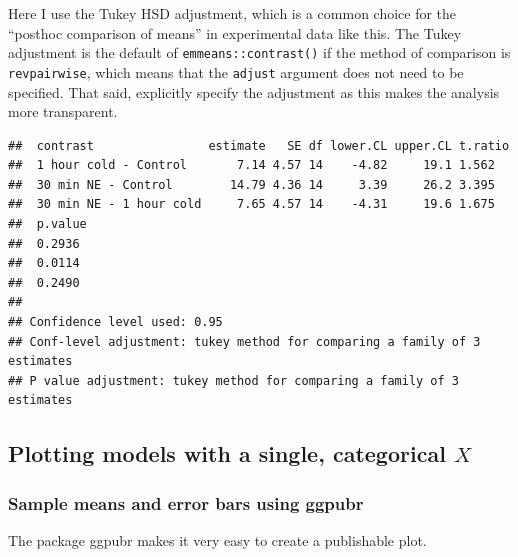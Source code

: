 \documentclass[]{book}
\newenvironment{Shaded}{\begin{snugshade}}{\end{snugshade}}
\newcommand{\DataTypeTok}[1]{\textcolor[rgb]{0.13,0.29,0.53}{#1}}
\newcommand{\KeywordTok}[1]{\textcolor[rgb]{0.13,0.29,0.53}{\textbf{#1}}}
\newcommand{\NormalTok}[1]{#1}
\newcommand{\OperatorTok}[1]{\textcolor[rgb]{0.81,0.36,0.00}{\textbf{#1}}}
\newcommand{\OtherTok}[1]{\textcolor[rgb]{0.56,0.35,0.01}{#1}}
\newcommand{\StringTok}[1]{\textcolor[rgb]{0.31,0.60,0.02}{#1}}
\begin{document}
Here I use the Tukey HSD adjustment, which is a common choice for the ``posthoc comparison of means'' in experimental data like this. The Tukey adjustment is the default of \texttt{emmeans::contrast()} if the method of comparison is \texttt{revpairwise}, which means that the \texttt{adjust} argument does not need to be specified. That said, explicitly specify the adjustment as this makes the analysis more transparent.

\begin{Shaded}
\end{Shaded}

\begin{verbatim}
##  contrast                estimate   SE df lower.CL upper.CL t.ratio
##  1 hour cold - Control       7.14 4.57 14    -4.82     19.1 1.562  
##  30 min NE - Control        14.79 4.36 14     3.39     26.2 3.395  
##  30 min NE - 1 hour cold     7.65 4.57 14    -4.31     19.6 1.675  
##  p.value
##  0.2936 
##  0.0114 
##  0.2490 
## 
## Confidence level used: 0.95 
## Conf-level adjustment: tukey method for comparing a family of 3 estimates 
## P value adjustment: tukey method for comparing a family of 3 estimates
\end{verbatim}

\hypertarget{plotting-models-with-a-single-categorical-x}{%
\subsection{\texorpdfstring{Plotting models with a single, categorical \(X\)}{Plotting models with a single, categorical X}}\label{plotting-models-with-a-single-categorical-x}}

\hypertarget{sample-means-and-error-bars-using-ggpubr}{%
\subsubsection{Sample means and error bars using ggpubr}\label{sample-means-and-error-bars-using-ggpubr}}

The package ggpubr makes it very easy to create a publishable plot.
\end{document}
